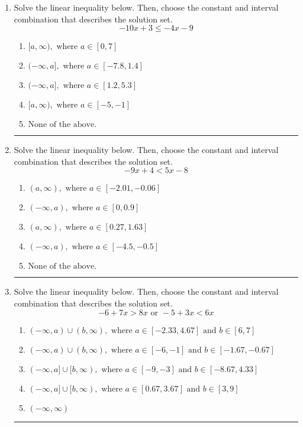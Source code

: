 \documentclass[14pt]{extbook}
\newcommand{\litem}[1]{\item#1\hspace*{-1cm}\rule{\textwidth}{0.4pt}}
\begin{document}
\begin{enumerate}
\litem{
Solve the linear inequality below. Then, choose the constant and interval combination that describes the solution set.\[ -10x + 3 \leq -4x -9 \]\begin{enumerate}[label=\Alph*.]
\item \( [a, \infty), \text{ where } a \in [0, 7] \)
\item \( (-\infty, a], \text{ where } a \in [-7.8, 1.4] \)
\item \( (-\infty, a], \text{ where } a \in [1.2, 5.3] \)
\item \( [a, \infty), \text{ where } a \in [-5, -1] \)
\item \( \text{None of the above}. \)

\end{enumerate} }
\litem{
Solve the linear inequality below. Then, choose the constant and interval combination that describes the solution set.\[ -9x + 4 < 5x -8 \]\begin{enumerate}[label=\Alph*.]
\item \( (a, \infty), \text{ where } a \in [-2.01, -0.06] \)
\item \( (-\infty, a), \text{ where } a \in [0, 0.9] \)
\item \( (a, \infty), \text{ where } a \in [0.27, 1.63] \)
\item \( (-\infty, a), \text{ where } a \in [-4.5, -0.5] \)
\item \( \text{None of the above}. \)

\end{enumerate} }
\litem{
Solve the linear inequality below. Then, choose the constant and interval combination that describes the solution set.\[ -6 + 7 x > 8 x \text{ or } -5 + 3 x < 6 x \]\begin{enumerate}[label=\Alph*.]
\item \( (-\infty, a) \cup (b, \infty), \text{ where } a \in [-2.33, 4.67] \text{ and } b \in [6, 7] \)
\item \( (-\infty, a) \cup (b, \infty), \text{ where } a \in [-6, -1] \text{ and } b \in [-1.67, -0.67] \)
\item \( (-\infty, a] \cup [b, \infty), \text{ where } a \in [-9, -3] \text{ and } b \in [-8.67, 4.33] \)
\item \( (-\infty, a] \cup [b, \infty), \text{ where } a \in [0.67, 3.67] \text{ and } b \in [3, 9] \)
\item \( (-\infty, \infty) \)


\end{enumerate}}
\end{enumerate}
\end{document}
